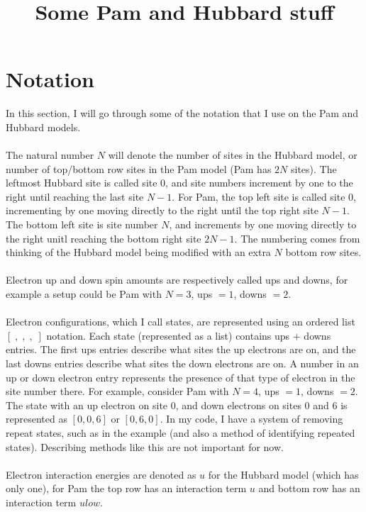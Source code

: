 
\title{Some Pam and Hubbard stuff}
\date{}

\maketitle
\section{Notation}
\noindent In this section, I will go through some of the notation that I use on the Pam and Hubbard models. \\
\\
The natural number $N$ will denote the number of sites in the Hubbard model, or number of top/bottom row sites in the Pam model (Pam has $2N$ sites).
The leftmost Hubbard site is called site $0$, and site numbers increment by one to the right until reaching the last site $N-1$.
For Pam, the top left site is called site $0$, incrementing by one moving directly to the right until the top right site $N-1$.
The bottom left site is site number $N$, and increments by one moving directly to the right unitl reaching the bottom right site $2N-1$.
The numbering comes from thinking of the Hubbard model being modified with an extra $N$ bottom row sites. \\
\\
Electron up and down spin amounts are respectively called ups and downs, for example a setup could be Pam with $N=3$, ups $=1$, downs $=2$. \\
\\
Electron configurations, which I call states, are represented using an ordered list $[\;,\;,\;,\;]$ notation.
Each state (represented as a list) contains ups $+$ downs entries.
The first ups entries describe what sites the up electrons are on, and the last downs entries describe what sites the down electrons are on.
A number in an up or down electron entry represents the presence of that type of electron in the site number there.
For example, consider Pam with $N=4$, ups $=1$, downs $=2$.
The state with an up electron on site $0$, and down electrons on sites $0$ and $6$ is represented as $[0,0,6]$ or $[0,6,0]$.
In my code, I have a system of removing repeat states, such as in the example (and also a method of identifying repeated states).
Describing methods like this are not important for now. \\
\\
Electron interaction energies are denoted as $u$ for the Hubbard model (which has only one), for Pam the top row has an interaction term $u$ and bottom row has an interaction term $ulow$. \\
